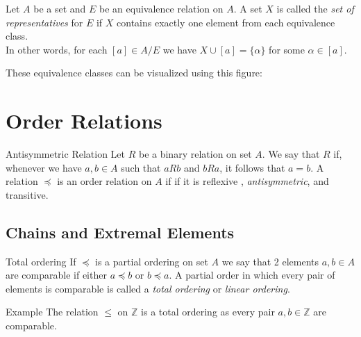 \documentclass[16pt,a4paper]{article}
\theoremstyle{definition}
\newcommand{\ord}{\preceq}
\begin{document}
\begin{defn}{}{}
Let $A$ be a set and $E$ be an equivalence relation on $A$.  A set $X$ is called the \textit{set of representatives} for $E$ if $X$ contains exactly one element from each equivalence class. \\
In other words, for each $[a] \in A/E$ we have $X\cup [a] = \{\alpha\}$ for some $\alpha \in [a]$. 
\end{defn}
These equivalence classes can be visualized using this figure:  
\begin{center}
\begin{figure}[hbpt]
\center
{}

\end{figure}
\end{center}


\newpage
\section{Order Relations}
\begin{defn}{Antisymmetric Relation}{}
Let $R$ be a binary relation on set $A$. We say that $R$ if, whenever we have $a,b \in A$ such that $aRb$ and $bRa$, it follows that $a=b$. A relation $\ord$ is an order relation on $A$ if if it is reflexive , \textit{antisymmetric}, and transitive.
\end{defn}
\subsection{Chains and Extremal Elements}
\begin{defn}{Total ordering}{}
If $\ord$ is a partial ordering on set $A$ we say that 2 elements $a,b \in A$ are comparable if either $a\ord b$ or $b \ord a$. A partial order in which every pair of elements is comparable is called a \textit{total ordering} or \textit{linear ordering}. \\
\end{defn}
{\color{red} Example} The relation $\leq$ on $\mathbb{Z}$ is a total ordering as every pair $a,b \in \mathbb{Z}$ are comparable. 
\end{document}
